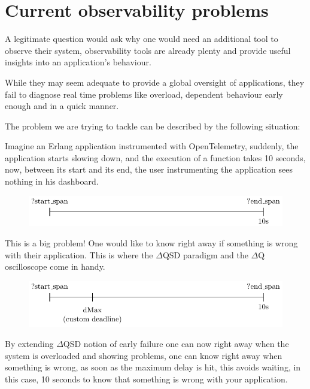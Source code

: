 \section{Current observability problems}

    A legitimate question would ask why one would need an additional tool to observe their system, observability tools are already plenty and provide useful insights into an application's behaviour.
    
    While they may seem adequate to provide a global oversight of applications, they fail to diagnose real time problems like overload, dependent behaviour early enough and in a quick manner. 
    
    The problem we are trying to tackle can be described by the following situation: 

Imagine an Erlang application instrumented with OpenTelemetry, suddenly, the application starts slowing down, and the execution of a function takes 10 seconds, now, between its start and its end, the user instrumenting the application sees nothing in his dashboard.
    \begin{figure}[H]
        \begin{center}
            \includegraphics{tikz/start_end.pdf}
        \end{center}
    \end{figure}
    This is a big problem! One would like to know right away if something is wrong with their application. This is where the $\Delta$QSD paradigm and the $\Delta$Q oscilloscope come in handy.
    \begin{figure}[H]
        \begin{center}
            \includegraphics{tikz/start_end_dmax.pdf}
        \end{center}
    \end{figure} 
    By extending $\Delta$QSD notion of early failure one can now right away when the system is overloaded and showing problems, one can know right away when something is wrong, as soon as the maximum delay is hit, this avoids waiting, in this case, 10 seconds to know that something is wrong with your application. \label{timeout}

